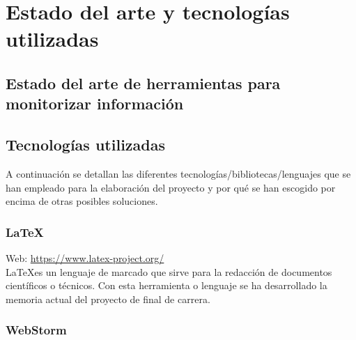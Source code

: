 \chapter[Estado del arte y tecnologías utilizadas]{Estado del arte y tecnologías utilizadas}
\label{chap:estado del arte}

\section[Estado del arte de herramientas para monitorizar información]{Estado del arte de herramientas para monitorizar información}


\section{Tecnologías utilizadas}

A continuación se detallan las diferentes tecnologías/bibliotecas/lenguajes que se han empleado para la elaboración del proyecto y por qué se han escogido por encima de otras posibles soluciones.


\subsection{\LaTeX}

Web: \url{https://www.latex-project.org/}\\

\LaTeX es un lenguaje de marcado que sirve para la redacción de documentos científicos o técnicos. Con esta herramienta o lenguaje se ha desarrollado la memoria actual del proyecto de final de carrera.



\subsection{WebStorm}


